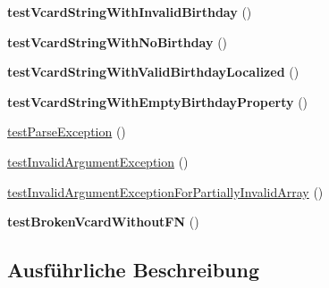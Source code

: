 \begin{DoxyCompactItemize}
\item 
\mbox{\label{class_sabre_1_1_v_object_1_1_birthday_calendar_generator_test_ad47dc1e4787bd61d4b9d67d0fcf51d90}} 
{\bfseries test\+Vcard\+String\+With\+Invalid\+Birthday} ()
\item 
\mbox{\label{class_sabre_1_1_v_object_1_1_birthday_calendar_generator_test_ad116c1a6794796dca1f5a16e77e0deac}} 
{\bfseries test\+Vcard\+String\+With\+No\+Birthday} ()
\item 
\mbox{\label{class_sabre_1_1_v_object_1_1_birthday_calendar_generator_test_aa54295e29d221d1692e039266448f145}} 
{\bfseries test\+Vcard\+String\+With\+Valid\+Birthday\+Localized} ()
\item 
\mbox{\label{class_sabre_1_1_v_object_1_1_birthday_calendar_generator_test_acff7a2f308e92fca5055b2810bfbdf89}} 
{\bfseries test\+Vcard\+String\+With\+Empty\+Birthday\+Property} ()
\item 
\mbox{\hyperlink{class_sabre_1_1_v_object_1_1_birthday_calendar_generator_test_a06dbe53a0b2232d512e63de761cba3aa}{test\+Parse\+Exception}} ()
\item 
\mbox{\hyperlink{class_sabre_1_1_v_object_1_1_birthday_calendar_generator_test_ababc5988b1b1cde3b073083ae15e7950}{test\+Invalid\+Argument\+Exception}} ()
\item 
\mbox{\hyperlink{class_sabre_1_1_v_object_1_1_birthday_calendar_generator_test_ae70c55578ba4efa2f9406c2c1f206af2}{test\+Invalid\+Argument\+Exception\+For\+Partially\+Invalid\+Array}} ()
\item 
\mbox{\label{class_sabre_1_1_v_object_1_1_birthday_calendar_generator_test_a6656c7b8959caadbd1393353768a328c}} 
{\bfseries test\+Broken\+Vcard\+Without\+FN} ()
\end{DoxyCompactItemize}


\subsection{Ausführliche Beschreibung}


